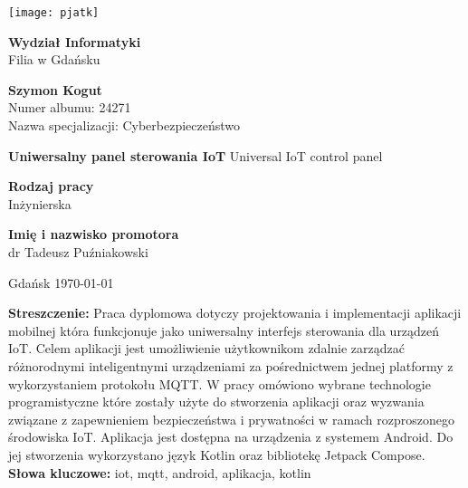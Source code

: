 \thispagestyle{empty}

\vspace*{2em}

\begin{center}
    \texttt{[image: pjatk]}
\end{center}

\vspace{3em}

\begin{center}
    \large
    \textbf{Wydział Informatyki}\\
    Filia w Gdańsku\\
    
    \vspace{3em}

    \textbf{Szymon Kogut}\\
    Numer albumu: 24271\\
    Nazwa specjalizacji: Cyberbezpieczeństwo\\
    
    \vspace{3em}

    \begin{center}
        \huge
        \textbf{Uniwersalny panel sterowania IoT}
        \Large
        Universal IoT control panel
    \end{center}

    \vspace{3em}
    
    \hfill
    \begin{varwidth}{\linewidth}
        \raggedright
        \textbf{Rodzaj pracy}\\
        Inżynierska\\

        \vspace{1em}

        \textbf{Imię i nazwisko promotora}\\
        dr Tadeusz Puźniakowski
    \end{varwidth}
\end{center}

\vfill

\begin{center}
    Gdańsk \today
\end{center}

\newpage
{
    \large
    \textbf{Streszczenie:}
    Praca dyplomowa dotyczy projektowania i implementacji aplikacji mobilnej która funkcjonuje jako uniwersalny interfejs sterowania dla urządzeń IoT. Celem aplikacji jest umożliwienie użytkownikom zdalnie zarządzać różnorodnymi inteligentnymi urządzeniami za pośrednictwem jednej platformy z wykorzystaniem protokołu MQTT. W pracy omówiono wybrane technologie programistyczne które zostały użyte do stworzenia aplikacji oraz wyzwania związane z zapewnieniem bezpieczeństwa i prywatności w ramach rozproszonego środowiska IoT. Aplikacja jest dostępna na urządzenia z systemem Android. Do jej stworzenia wykorzystano język Kotlin oraz bibliotekę Jetpack Compose.\\

    \textbf{Słowa kluczowe:} iot, mqtt, android, aplikacja, kotlin
}